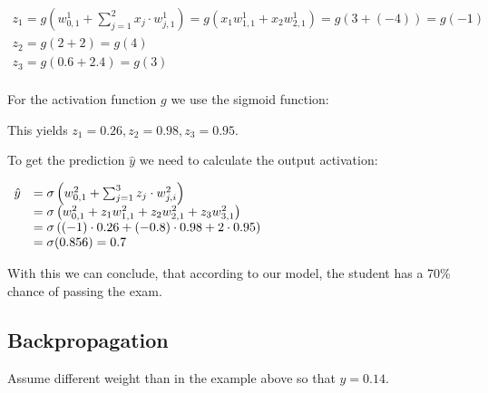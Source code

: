 \documentclass[
../../EiKI_Summary.tex,
]
{subfiles}
\begin{document}
\begin{csmb*}
    $\begin{array}{l}
        z_1 = g\left(w_{0,1}^1 + \sum_{j=1}^{2} x_j \cdot w_{j,1}^1\right) = g\left(x_1w_{1,1}^1 + x_2w_{2,1}^1\right) = g\left(3 + (-4)\right) = g(-1)\\
        z_2 = g\left(2+2\right) = g(4)\\
        z_3 = g\left(0.6 + 2.4\right) = g(3)\\
    \end{array}$
\end{csmb*}

For the activation function $g$ we use the sigmoid function: 

This yields $z_1 = 0.26, z_2 = 0.98, z_3 = 0.95$.

To get the prediction $\hat{y}$ we need to calculate the output activation:

\begin{csmb*}
    $\begin{array}{r l}
        \hat{y} &= \sigma\left(w_{0,1}^2 + \sum_{j=1}^{3} z_j \cdot w_{j,i}^2\right)\\ 
        &= \sigma\left(w_{0,1}^2 + z_1w_{1,1}^2 + z_2w_{2,1}^2 + z_3w_{3,1}^2\right)\\
        &= \sigma\left((-1)\cdot 0.26 + (-0.8) \cdot 0.98 + 2 \cdot 0.95\right)\\
        &= \sigma(0.856) = 0.7\\
    \end{array}$
\end{csmb*}

With this we can conclude, that according to our model, the student has a 70\% chance of passing the exam.

\subsection{Backpropagation}
Assume different weight than in the example above so that $\hat{y} = 0.14$.
\end{document}
